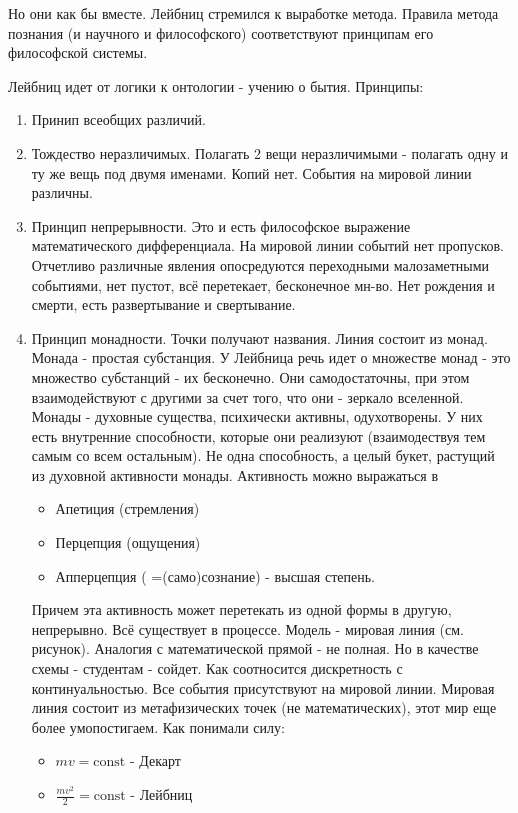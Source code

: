 Но они как бы вместе. Лейбниц стремился к выработке метода. Правила метода познания (и научного и философского) соответствуют принципам его философской системы.

Лейбниц идет от логики к онтологии - учению о бытия. Принципы:
\begin{enumerate}
	\item Принип всеобщих различий. 
	\item Тождество неразличимых. Полагать 2 вещи неразличимыми - полагать одну и ту же вещь под двумя именами. Копий нет. События на мировой линии различны. 
	\item Принцип непрерывности. Это и есть философское выражение математического дифференциала. На мировой линии событий нет пропусков. Отчетливо различные явления опосредуются переходными малозаметными событиями, нет пустот, всё перетекает, бесконечное мн-во. Нет рождения и смерти, есть развертывание и свертывание. 
	\item Принцип монадности. Точки получают названия. Линия состоит из монад. Монада - простая субстанция. У Лейбница речь идет о множестве монад - это множество субстанций - их бесконечно. Они самодостаточны, при этом взаимодействуют с другими за счет того, что они - зеркало вселенной. Монады - духовные существа, психически активны, одухотворены. У них есть внутренние способности, которые они реализуют (взаимодествуя тем самым со всем остальным). Не одна способность, а целый букет, растущий из духовной активности монады. Активность можно выражаться в 
	\begin{itemize}
		\item Апетиция (стремления)
		\item Перцепция (ощущения)
		\item Апперцепция ( =(само)сознание) - высшая степень.
	\end{itemize}
	Причем эта активность может перетекать из одной формы в другую, непрерывно. 
	Всё существует в процессе. 
	Модель - мировая линия (см. рисунок). Аналогия с математической прямой - не полная. Но в качестве схемы - студентам - сойдет. Как соотносится дискретность с континуальностью. Все события присутствуют на мировой линии. Мировая линия состоит из метафизических точек (не математических), этот мир еще более умопостигаем.
	Как понимали силу:
	\begin{itemize}
		\item $mv=\text{const}$ - Декарт
		\item $\frac{mv^2}2=\text{const}$ - Лейбниц
	\end{itemize}

\end{enumerate}
